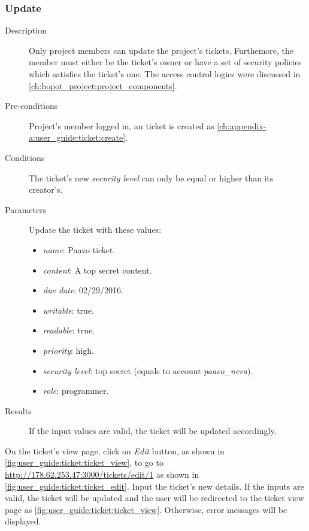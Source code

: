 \clearpage

\subsubsection{Update}
\label{ch:appendix-a:user_guide:ticket:update}

\begin{description}
\item[Description] Only project members can update the project's tickets.
Furthemore, the member must either be the ticket's owner or have a set of security policies which satisfies the ticket's one.
The access control logics were discussed in \autoref{ch:hopot_project:project_components}.
\item[Pre-conditions] Project's member logged in, an ticket is created as \autoref{ch:appendix-a:user_guide:ticket:create}.
\item[Conditions] The ticket's new \emph{security level} can only be equal or higher than its creator's.
\item[Parameters] Update the ticket with these values:
\begin{itemize}
\item \emph{name}: Paavo ticket.
\item \emph{content}: A top secret content.
\item \emph{due date}: 02/29/2016.
\item \emph{writable}: true.
\item \emph{readable}: true.
\item \emph{priority}: high.
\item \emph{security level}: top secret (equals to account \emph{paavo\_neva}).
\item \emph{role}: programmer.
\end{itemize}
\item[Results] If the input values are valid, the ticket will be updated accordingly.
\end{description}

On the ticket's view page, click on \emph{Edit} button, as shown in \autoref{fig:user_guide:ticket:ticket_view}, to go to \href{http://178.62.253.47:3000/tickets/edit/1}{http://178.62.253.47:3000/tickets/edit/1} as shown in \autoref{fig:user_guide:ticket:ticket_edit}.
Input the ticket's new details.
If the inputs are valid, the ticket will be updated and the user will be redirected to the ticket view page as \autoref{fig:user_guide:ticket:ticket_view}.
Otherwise, error messages will be displayed.

